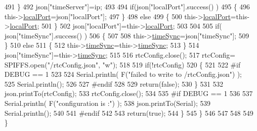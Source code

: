 \begin{DoxyCode}
491             \}
492             json[\textcolor{stringliteral}{"timeServer"}]=ip;
493             
494             \textcolor{keywordflow}{if}(json[\textcolor{stringliteral}{"localPort"}].success() )
495             \{                       
496                 this->\hyperlink{classCoolTime_a2f777da44d7ba678be8185299e9b49d1}{localPort}=json[\textcolor{stringliteral}{"localPort"}];
497             \}
498             \textcolor{keywordflow}{else}
499             \{
500                 this->\hyperlink{classCoolTime_a2f777da44d7ba678be8185299e9b49d1}{localPort}=this->\hyperlink{classCoolTime_a2f777da44d7ba678be8185299e9b49d1}{localPort};
501             \}
502             json[\textcolor{stringliteral}{"localPort"}]=this->\hyperlink{classCoolTime_a2f777da44d7ba678be8185299e9b49d1}{localPort};
503 
504 
505             \textcolor{keywordflow}{if}( json[\textcolor{stringliteral}{"timeSync"}].success() )
506             \{
507 
508                 this->\hyperlink{classCoolTime_a9d032e76c3470a15b3bbbc52af6463f7}{timeSync}=json[\textcolor{stringliteral}{"timeSync"}];
509             \}
510             \textcolor{keywordflow}{else}
511             \{
512                 this->\hyperlink{classCoolTime_a9d032e76c3470a15b3bbbc52af6463f7}{timeSync}=this->\hyperlink{classCoolTime_a9d032e76c3470a15b3bbbc52af6463f7}{timeSync};
513             \}
514             json[\textcolor{stringliteral}{"timeSync"}]=this->\hyperlink{classCoolTime_a9d032e76c3470a15b3bbbc52af6463f7}{timeSync};
515 
516             rtcConfig.close();
517             rtcConfig= SPIFFS.open(\textcolor{stringliteral}{"/rtcConfig.json"}, \textcolor{stringliteral}{"w"});
518             
519             \textcolor{keywordflow}{if}(!rtcConfig)
520             \{
521             
522 \textcolor{preprocessor}{            #if DEBUG == 1}
523 
524                 Serial.println( F(\textcolor{stringliteral}{"failed to write to /rtcConfig.json"}) );
525                 Serial.println();
526             
527 \textcolor{preprocessor}{            #endif}
528 
529                 \textcolor{keywordflow}{return}(\textcolor{keyword}{false});
530             \}
531             
532             json.printTo(rtcConfig);
533             rtcConfig.close();
534 
535 \textcolor{preprocessor}{        #if DEBUG == 1 }
536 
537             Serial.println( F(\textcolor{stringliteral}{"configuration is :"}) );
538             json.printTo(Serial);
539             Serial.println();
540         
541 \textcolor{preprocessor}{        #endif}
542         
543             \textcolor{keywordflow}{return}(\textcolor{keyword}{true}); 
544         \}
545     \}   
546 
547 
548 
549 \}
\end{DoxyCode}
